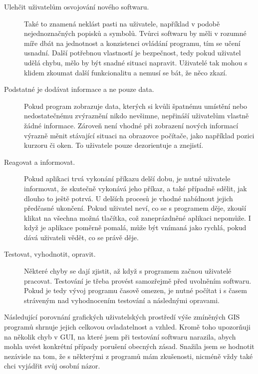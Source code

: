 \documentclass[a4paper,12pt,draft]{article}
\begin{document}
{\begin{description}
\item [Ulehčit uživatelům osvojování nového softwaru.] Také to znamená
neklást pasti na uživatele, například v podobě nejednoznačných popisků
a symbolů. Tvůrci softwaru by měli v rozumné míře dbát na jednotnost
a konzistenci ovládání programu, tím se učení usnadní. Další
potřebnou vlastností je bezpečnost, tedy pokud uživatel udělá chybu,
mělo by být snadné situaci napravit. Uživatelé tak mohou s klidem
zkoumat další funkcionalitu a nemusí se bát, že něco zkazí.

\item [Podstatné je dodávat informace a ne pouze data.] Pokud program
zobrazuje data, kterých si kvůli špatnému umístění nebo nedostatečnému
zvýraznění nikdo nevšimne, nepřináší uživatelům vlastně žádné
informace. Zároveň není vhodné při zobrazení nových informací výrazně
měnit stávající situaci na obrazovce počítače, jako například pozici
kurzoru či oken. To uživatele pouze dezorientuje a znejistí.

\item [Reagovat a informovat.] Pokud aplikaci trvá vykonání příkazu
delší dobu, je nutné uživatele informovat, že skutečně vykonává
jeho příkaz, a také případně sdělit, jak dlouho to ještě potrvá. U
delších procesů je vhodné nabídnout jejich předčasné ukončení. Pokud
uživatel neví, co se s programem děje, zkouší klikat na všechna možná
tlačítka, což zaneprázdněné aplikaci nepomůže. I když je aplikace
poměrně pomalá, může být vnímaná jako rychlá, pokud dává uživateli
vědět, co se právě děje.

\item [Testovat, vyhodnotit, opravit.] Některé chyby se dají zjistit,
až když s programem začnou uživatelé pracovat. Testování je třeba
provést samozřejmě před uvolněním softwaru. Pokud je tedy vývoj
programu časově omezen, je nutné počítat i s časem stráveným nad
vyhodnocením testování a následnými opravami.
 \end{description}

Následující porovnání grafických uživatelských prostředí
výše zmíněných GIS programů shrnuje jejich celkovou ovladatelnost a
vzhled. Kromě toho upozorňuji na několik chyb v GUI, na které jsem při
testování softwaru narazila, abych mohla uvést konkrétní případy
porušení obecných zásad. Snažila jsem se hodnotit nezávisle na tom,
že s některými z programů mám zkušenosti, nicméně vždy také chci
vyjádřit svůj osobní názor.

}
\end{document}
